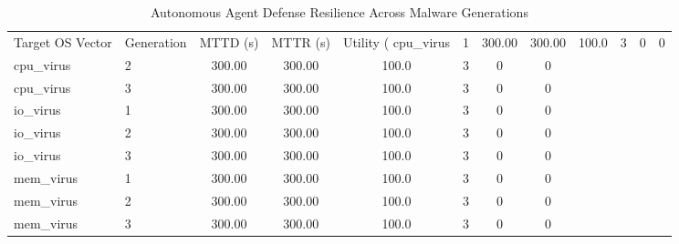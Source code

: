 \begin{table}[htbp]
\centering
\caption{Autonomous Agent Defense Resilience Across Malware Generations}
\label{tab:resilience_metrics}
\begin{tabular}{llcccccc}
\toprule
\midrule
Target OS Vector & Generation & MTTD (s) & MTTR (s) & Utility (%
\midrule
cpu_virus & 1 & 300.00 & 300.00 & 100.0 & 3 & 0 & 0 \\
cpu_virus & 2 & 300.00 & 300.00 & 100.0 & 3 & 0 & 0 \\
cpu_virus & 3 & 300.00 & 300.00 & 100.0 & 3 & 0 & 0 \\
io_virus & 1 & 300.00 & 300.00 & 100.0 & 3 & 0 & 0 \\
io_virus & 2 & 300.00 & 300.00 & 100.0 & 3 & 0 & 0 \\
io_virus & 3 & 300.00 & 300.00 & 100.0 & 3 & 0 & 0 \\
mem_virus & 1 & 300.00 & 300.00 & 100.0 & 3 & 0 & 0 \\
mem_virus & 2 & 300.00 & 300.00 & 100.0 & 3 & 0 & 0 \\
mem_virus & 3 & 300.00 & 300.00 & 100.0 & 3 & 0 & 0 \\
\bottomrule
\end{tabular}
\end{table}

